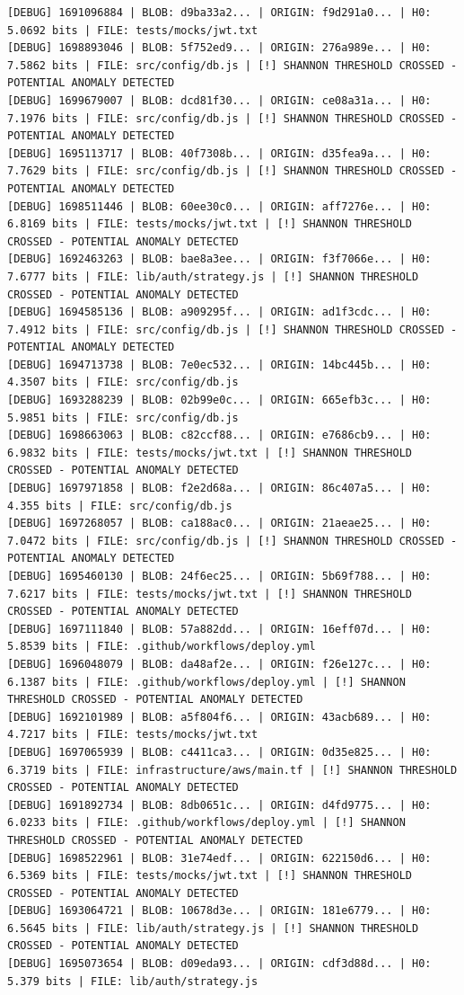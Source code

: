 \documentclass[12pt, a4paper, oneside]{report}
\begin{document}
\begin{lstlisting}[basicstyle=\tiny\ttfamily]
[DEBUG] 1691096884 | BLOB: d9ba33a2... | ORIGIN: f9d291a0... | H0: 5.0692 bits | FILE: tests/mocks/jwt.txt
[DEBUG] 1698893046 | BLOB: 5f752ed9... | ORIGIN: 276a989e... | H0: 7.5862 bits | FILE: src/config/db.js | [!] SHANNON THRESHOLD CROSSED - POTENTIAL ANOMALY DETECTED
[DEBUG] 1699679007 | BLOB: dcd81f30... | ORIGIN: ce08a31a... | H0: 7.1976 bits | FILE: src/config/db.js | [!] SHANNON THRESHOLD CROSSED - POTENTIAL ANOMALY DETECTED
[DEBUG] 1695113717 | BLOB: 40f7308b... | ORIGIN: d35fea9a... | H0: 7.7629 bits | FILE: src/config/db.js | [!] SHANNON THRESHOLD CROSSED - POTENTIAL ANOMALY DETECTED
[DEBUG] 1698511446 | BLOB: 60ee30c0... | ORIGIN: aff7276e... | H0: 6.8169 bits | FILE: tests/mocks/jwt.txt | [!] SHANNON THRESHOLD CROSSED - POTENTIAL ANOMALY DETECTED
[DEBUG] 1692463263 | BLOB: bae8a3ee... | ORIGIN: f3f7066e... | H0: 7.6777 bits | FILE: lib/auth/strategy.js | [!] SHANNON THRESHOLD CROSSED - POTENTIAL ANOMALY DETECTED
[DEBUG] 1694585136 | BLOB: a909295f... | ORIGIN: ad1f3cdc... | H0: 7.4912 bits | FILE: src/config/db.js | [!] SHANNON THRESHOLD CROSSED - POTENTIAL ANOMALY DETECTED
[DEBUG] 1694713738 | BLOB: 7e0ec532... | ORIGIN: 14bc445b... | H0: 4.3507 bits | FILE: src/config/db.js
[DEBUG] 1693288239 | BLOB: 02b99e0c... | ORIGIN: 665efb3c... | H0: 5.9851 bits | FILE: src/config/db.js
[DEBUG] 1698663063 | BLOB: c82ccf88... | ORIGIN: e7686cb9... | H0: 6.9832 bits | FILE: tests/mocks/jwt.txt | [!] SHANNON THRESHOLD CROSSED - POTENTIAL ANOMALY DETECTED
[DEBUG] 1697971858 | BLOB: f2e2d68a... | ORIGIN: 86c407a5... | H0: 4.355 bits | FILE: src/config/db.js
[DEBUG] 1697268057 | BLOB: ca188ac0... | ORIGIN: 21aeae25... | H0: 7.0472 bits | FILE: src/config/db.js | [!] SHANNON THRESHOLD CROSSED - POTENTIAL ANOMALY DETECTED
[DEBUG] 1695460130 | BLOB: 24f6ec25... | ORIGIN: 5b69f788... | H0: 7.6217 bits | FILE: tests/mocks/jwt.txt | [!] SHANNON THRESHOLD CROSSED - POTENTIAL ANOMALY DETECTED
[DEBUG] 1697111840 | BLOB: 57a882dd... | ORIGIN: 16eff07d... | H0: 5.8539 bits | FILE: .github/workflows/deploy.yml
[DEBUG] 1696048079 | BLOB: da48af2e... | ORIGIN: f26e127c... | H0: 6.1387 bits | FILE: .github/workflows/deploy.yml | [!] SHANNON THRESHOLD CROSSED - POTENTIAL ANOMALY DETECTED
[DEBUG] 1692101989 | BLOB: a5f804f6... | ORIGIN: 43acb689... | H0: 4.7217 bits | FILE: tests/mocks/jwt.txt
[DEBUG] 1697065939 | BLOB: c4411ca3... | ORIGIN: 0d35e825... | H0: 6.3719 bits | FILE: infrastructure/aws/main.tf | [!] SHANNON THRESHOLD CROSSED - POTENTIAL ANOMALY DETECTED
[DEBUG] 1691892734 | BLOB: 8db0651c... | ORIGIN: d4fd9775... | H0: 6.0233 bits | FILE: .github/workflows/deploy.yml | [!] SHANNON THRESHOLD CROSSED - POTENTIAL ANOMALY DETECTED
[DEBUG] 1698522961 | BLOB: 31e74edf... | ORIGIN: 622150d6... | H0: 6.5369 bits | FILE: tests/mocks/jwt.txt | [!] SHANNON THRESHOLD CROSSED - POTENTIAL ANOMALY DETECTED
[DEBUG] 1693064721 | BLOB: 10678d3e... | ORIGIN: 181e6779... | H0: 6.5645 bits | FILE: lib/auth/strategy.js | [!] SHANNON THRESHOLD CROSSED - POTENTIAL ANOMALY DETECTED
[DEBUG] 1695073654 | BLOB: d09eda93... | ORIGIN: cdf3d88d... | H0: 5.379 bits | FILE: lib/auth/strategy.js
\end{lstlisting}
\end{document}
